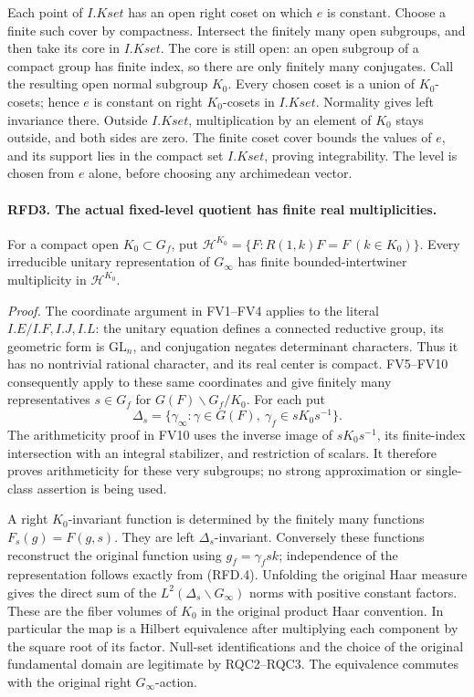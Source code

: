 Each point of \(I.Kset\) has an open right coset on which \(e\)
is constant.  Choose a finite such cover by compactness.  Intersect
the finitely many open subgroups, and then take its core in
\(I.Kset\).  The core is still open: an open subgroup of a compact
group has finite index, so there are only finitely many conjugates.
Call the resulting open normal subgroup \(K_0\).  Every chosen
coset is a union of \(K_0\)-cosets; hence \(e\) is constant on
right \(K_0\)-cosets in \(I.Kset\).  Normality gives left
invariance there.  Outside \(I.Kset\), multiplication by an element
of \(K_0\) stays outside, and both sides are zero.  The finite
coset cover bounds the values of \(e\), and its support lies in
the compact set \(I.Kset\), proving integrability.  The level is
chosen from \(e\) alone, before choosing any archimedean vector.

\paragraph{RFD3. The actual fixed-level quotient has finite real multiplicities.}
\label{claim:RFD3}
For a compact open \(K_0\subset G_f\), put
\(\mathcal H^{K_0}=\{F:R(1,k)F=F\ (k\in K_0)\}\).
Every irreducible unitary representation of \(G_\infty\) has
finite bounded-intertwiner multiplicity in \(\mathcal H^{K_0}\).

\emph{Proof.}
The coordinate argument in FV1--FV4 applies to the literal
\(I.E/I.F,I.J,I.L\): the unitary equation defines a connected
reductive group, its geometric form is \(\mathrm{GL}_n\),
and conjugation negates determinant characters.  Thus it has no
nontrivial rational character, and its real center is compact.
FV5--FV10 consequently apply to these same coordinates and give
finitely many representatives \(s\in G_f\) for
\(G(F)\backslash G_f/K_0\).  For each put
\[
 \Delta_s=\{\gamma_\infty:\gamma\in G(F),\
                         \gamma_f\in sK_0s^{-1}\}.
 \tag{RFD.4}
\]
The arithmeticity proof in FV10 uses the inverse image of
\(sK_0s^{-1}\), its finite-index intersection with an integral
stabilizer, and restriction of scalars.  It therefore proves
arithmeticity for these very subgroups; no strong approximation
or single-class assertion is being used.

A right \(K_0\)-invariant function is determined by the finitely
many functions \(F_s(g)=F(g,s)\).  They are left
\(\Delta_s\)-invariant.  Conversely these functions reconstruct
the original function using \(g_f=\gamma_fs k\); independence
of the representation follows exactly from (RFD.4).
Unfolding the original Haar measure gives the direct sum of the
\(L^2(\Delta_s\backslash G_\infty)\) norms with positive
constant factors.  These are the fiber volumes of \(K_0\) in
the original product Haar convention.  In particular the map is
a Hilbert equivalence after multiplying each component by the
square root of its factor.  Null-set identifications and the
choice of the original fundamental domain are legitimate by
RQC2--RQC3.  The equivalence commutes with the original right
\(G_\infty\)-action.

